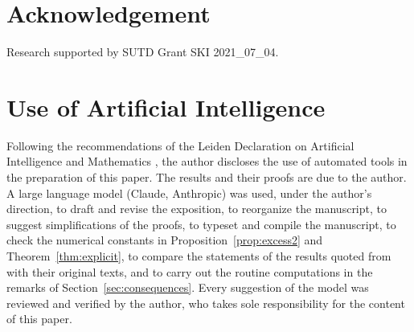 \documentclass[12pt]{amsart}
\theoremstyle{definition}
\begin{document}
\section*{Acknowledgement}

Research supported by SUTD Grant SKI 2021\_07\_04.

\section*{Use of Artificial Intelligence}

Following the recommendations of the Leiden Declaration on Artificial
Intelligence and Mathematics \cite{Leiden2026}, the author discloses the use
of automated tools in the preparation of this paper. The results and their
proofs are due to the author. A large language model (Claude, Anthropic) was
used, under the author's direction, to draft and revise the exposition, to
reorganize the manuscript, to suggest simplifications of the proofs, to
typeset and compile the manuscript, to check the numerical constants in
Proposition~\ref{prop:excess2} and Theorem~\ref{thm:explicit}, to compare
the statements of the results quoted from \cite{CKK1983, Chouinard1996,
RCW1975} with their original texts, and to carry out the routine
computations in the remarks of Section~\ref{sec:consequences}. Every
suggestion of the model was reviewed and verified by the author, who takes
sole responsibility for the content of this paper.
\end{document}
